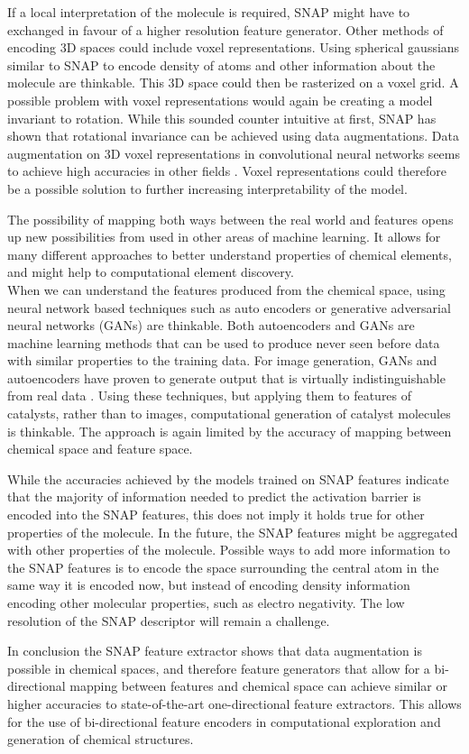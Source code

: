 If a local interpretation of the molecule is required, SNAP might have to exchanged in favour of a higher resolution 
feature generator.
Other methods of encoding 3D spaces could include voxel representations.
Using spherical gaussians similar to SNAP to encode density of atoms and other information about the molecule are thinkable.
This 3D space could then be rasterized on a voxel grid.
A possible problem with voxel representations would again be creating a model invariant to rotation.
While this sounded counter intuitive at first, SNAP has shown that rotational invariance can be achieved using data augmentations.
Data augmentation on 3D voxel representations in convolutional neural networks seems to achieve high accuracies in 
other fields \cite{7353481}.
Voxel representations could therefore be a possible solution to further increasing interpretability of the model.

The possibility of mapping both ways between the real world and features opens up new possibilities from 
used in other areas of machine learning.
It allows for many different approaches to better understand properties of chemical elements, 
and might help to computational element discovery.
\\
When we can understand the features produced from the chemical space,
using neural network based techniques such as auto encoders or generative adversarial neural networks (GANs) are thinkable.
Both autoencoders and GANs are machine learning methods that can be used to produce never seen before data with similar properties
to the training data.
For image generation, GANs and autoencoders have proven to generate output that is virtually indistinguishable from real data \cite{karras2019stylebased} .
Using these techniques, but applying them to features of catalysts, rather than to images, computational generation of catalyst molecules is thinkable.
The approach is again limited by the accuracy of mapping between chemical space and feature space.

While the accuracies achieved by the models trained on SNAP features indicate that 
the majority of information needed to predict the activation barrier is encoded into the SNAP features, this does
not imply it holds true for other properties of the molecule.
In the future, the SNAP features might be aggregated with other properties of the molecule.
Possible ways to add more information to the SNAP features is to encode the space surrounding the 
central atom in the same way it is encoded now, but instead of encoding density information encoding 
other molecular properties, such as electro negativity.
The low resolution of the SNAP descriptor will remain a challenge.

In conclusion the SNAP feature extractor shows that data augmentation is possible in chemical spaces, and therefore 
feature generators that allow for a bi-directional mapping between features and chemical space can achieve similar or higher
accuracies to state-of-the-art one-directional feature extractors.
This allows for the use of bi-directional feature encoders in computational exploration and generation of chemical structures.
